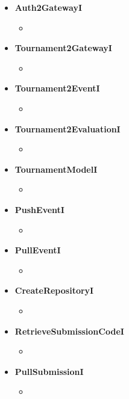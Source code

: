 \begin{itemize}
\begin{itemize}
        \item 
    \end{itemize}
    \item \textbf{Auth2GatewayI}
    \begin{itemize}
        \item 
    \end{itemize}
    \item \textbf{Tournament2GatewayI}
    \begin{itemize}
        \item 
    \end{itemize}
    \item \textbf{Tournament2EventI}
    \begin{itemize}
        \item 
    \end{itemize}
    \item \textbf{Tournament2EvaluationI}
    \begin{itemize}
        \item 
    \end{itemize}
    \item \textbf{TournamentModelI}
    \begin{itemize}
        \item 
    \end{itemize}
    \item \textbf{PushEventI}
    \begin{itemize}
        \item 
    \end{itemize}
    \item \textbf{PullEventI}
    \begin{itemize}
        \item 
    \end{itemize}
    \item \textbf{CreateRepositoryI}
    \begin{itemize}
        \item 
    \end{itemize}
    \item \textbf{RetrieveSubmissionCodeI}
    \begin{itemize}
        \item 
    \end{itemize}
    \item \textbf{PullSubmissionI}
    \begin{itemize}
        \item 
    \end{itemize}

\end{itemize}
